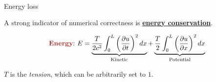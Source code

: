\begin{frame}{Energy loss}
    \small

    A strong indicator of numerical correctness is \textbf{\underline{energy conservation}}.

    \pause

    \begin{equation*}
        \text{\textbf{\textcolor{BrickRed}{Energy}}:} \ E=\underbrace{\frac{T}{2c^2}\int_0^L\left(\frac{\partial u}{\partial t}\right)^2dx}_{\text{Kinetic}}+\underbrace{\frac{T}{2}\int_0^L\left(\frac{\partial u}{\partial x}\right)^2dx}_{\text{Potential}}
    \end{equation*}

    $T$ is the \textit{tension}, which can be arbitrarily set to $1$.

    \vfill

    \scriptsize

\end{frame}
